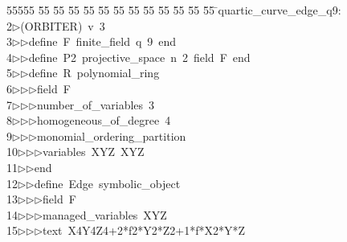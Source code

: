 %
%
\begin{tabbing}
55555 \= 55 \= 55 \= 55 \= 55 \= 55 \= 55 \= 55 \= 55 \= 55 \= 55 \= 55 \= 55 \= \>quartic\_curve\_edge\_q9:\\[0pt]
2\>$\triangleright$\>(ORBITER)\ v\ 3\ \\[0pt]
3\>$\triangleright$\>$\triangleright$\>define\ F\ finite\_field\ q\ 9\ end\ \\[0pt]
4\>$\triangleright$\>$\triangleright$\>define\ P2\ projective\_space\ n\ 2\ field\ F\ end\ \\[0pt]
5\>$\triangleright$\>$\triangleright$\>define\ R\ polynomial\_ring\ \\[0pt]
6\>$\triangleright$\>$\triangleright$\>$\triangleright$\>field\ F\ \\[0pt]
7\>$\triangleright$\>$\triangleright$\>$\triangleright$\>number\_of\_variables\ 3\ \\[0pt]
8\>$\triangleright$\>$\triangleright$\>$\triangleright$\>homogeneous\_of\_degree\ 4\ \\[0pt]
9\>$\triangleright$\>$\triangleright$\>$\triangleright$\>monomial\_ordering\_partition\ \\[0pt]
10\>$\triangleright$\>$\triangleright$\>$\triangleright$\>variables\ XYZ\ XYZ\ \\[0pt]
11\>$\triangleright$\>$\triangleright$\>end\ \\[0pt]
12\>$\triangleright$\>$\triangleright$\>define\ Edge\ symbolic\_object\ \\[0pt]
13\>$\triangleright$\>$\triangleright$\>$\triangleright$\>field\ F\ \\[0pt]
14\>$\triangleright$\>$\triangleright$\>$\triangleright$\>managed\_variables\ XYZ\ \\[0pt]
15\>$\triangleright$\>$\triangleright$\>$\triangleright$\>text\ X4Y4Z4+2*f2*Y2*Z2+1*f*X2*Y*Z\ \\[0pt]

\end{tabbing}
